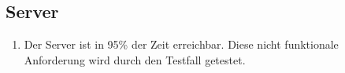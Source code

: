 \subsection*{Server}

\begin{samepage}
    \begin{enumerate}[label=\textbf{/NFV\arabic*0/}, align=left, start=2]
        \item \label{/NFV20/} Der \Gls{Server} ist in 95\% der Zeit erreichbar. Diese nicht funktionale Anforderung wird durch den Testfall  getestet.
    \end{enumerate}
\end{samepage}
